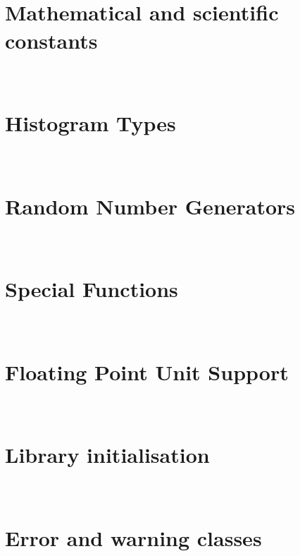 \documentclass{manual}
\makeatletter
\let\py@OldOldChapter=\chapter
\renewcommand{\chapter}{\py@reset%
                        \py@OldOldChapter}
\makeatother
\begin{document}
\chapter[\protect\module{pygsl.const} --- Mathematical and scientific
constants]{\protect{} \\ Mathematical and scientific
constants} 
\label{cha:const-module}




\chapter[\protect\module{pygsl.histogram} --- Histogram Types]
{\protect{} \\ Histogram Types}
\label{cha:histogram-module}


\chapter[\protect\module{pygsl.rng} --- Random Number Generators]
{\protect{} \\ Random Number Generators}
\label{cha:rng-module}


\chapter[\protect\module{pygsl.sf} --- Special Functions]
{\protect{} \\ Special Functions}
\label{cha:sf-module}




\appendix

\chapter[\protect\module{pygsl.ieee} --- Floating Point Unit Support]
{\protect{} \\ Floating Point Unit Support}
\label{cha:ieee-module}


\chapter[\protect\module{pygsl.init} --- Library initialisation]
{\protect{} \\ Library initialisation}
\label{cha:library-initialisation}


\chapter[\protect\module{pygsl.errors} --- Error and warning classes]
{\protect{} \\ Error and warning classes} 
\label{cha:error-module}



\end{document}
